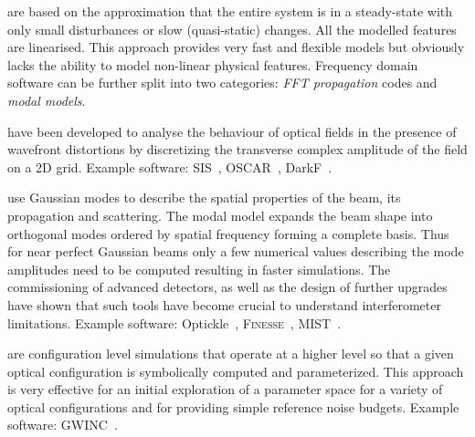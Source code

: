  are based on the approximation that the entire system is in a steady-state with only small disturbances or slow (quasi-static) changes. All the modelled features are linearised.
This approach provides very fast and flexible models but obviously lacks the ability to model non-linear physical features. Frequency domain software can be further split
into two categories: \emph{FFT propagation} codes and \emph{modal models}.

\newpage

 have been developed to analyse the behaviour of optical fields in the presence of wavefront distortions by discretizing the transverse complex amplitude of the field on a 2D grid.
Example software: SIS~\cite{SIS}, OSCAR~\cite{OSCAR}, DarkF~\cite{DarkF, Vinet92}.
 
 use Gaussian modes to describe the spatial properties of the beam, its propagation and scattering. The modal model expands the beam shape into orthogonal modes ordered by spatial frequency forming a complete basis. Thus for near perfect Gaussian beams only a few numerical values describing the mode amplitudes need to be computed resulting in faster simulations. The commissioning of advanced detectors, as well as the design of further upgrades have shown that such tools have become crucial to understand interferometer limitations. 
Example software: Optickle~\cite{Optickle}, \textsc{Finesse}~\cite{Finesse, Freise04}, MIST~\cite{MIST}.

 are configuration level simulations that operate at a higher level so that a given optical configuration is symbolically computed and parameterized. 
This approach is very effective for an initial exploration of a parameter space for a variety of optical configurations and for providing simple reference noise budgets. Example software: GWINC~\cite{GWINC}.

